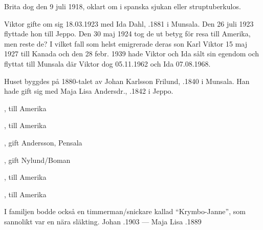 Brita dog den 9 juli 1918, oklart om i spanska sjukan eller struptuberkulos.


%
Viktor gifte om sig 18.03.1923 med Ida Dahl, .1881 i Munsala. Den 26 juli 1923 flyttade hon till Jeppo. Den 30 maj 1924 tog de ut betyg för resa till Amerika, men reste de? I vilket fall som helst emigrerade deras son Karl Viktor 15 maj 1927 till Kanada och den 28 febr. 1939 hade Viktor och Ida sålt sin egendom och flyttat till Munsala där Viktor dog 05.11.1962 och Ida 07.08.1968.


%
Huset byggdes på 1880-talet av Johan Karlsson Frilund, .1840 i Munsala. Han hade gift sig med Maja Lisa Andersdr., .1842 i Jeppo.
\begin{jhchildren}
  \item {}, till Amerika
  \item {}, till Amerika
  \item {}
  \item {}, gift Andersson, Pensala
  \item {}, gift Nylund/Boman
  \item {}, till Amerika
  \item {}, till Amerika
\end{jhchildren}
I familjen bodde också en timmerman/snickare kallad ``Krymbo-Janne'', som sannolikt var en nära släkting.
Johan .1903  ---  Maja Lisa .1889



%



